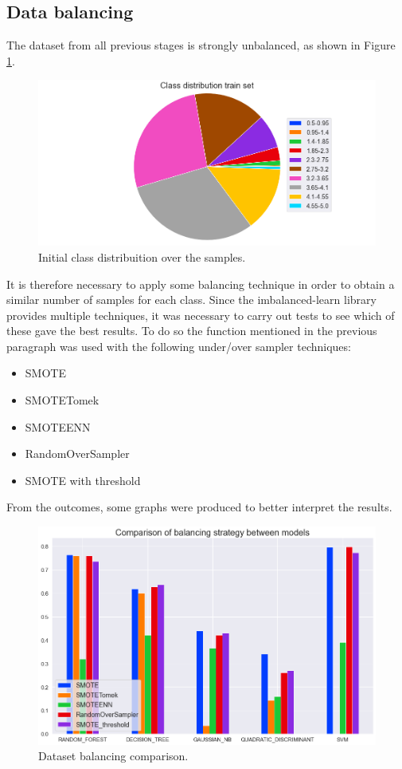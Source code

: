 \documentclass[../main]{subfiles}
\begin{document}
\subsection*{Data balancing}
The dataset from all previous stages is strongly unbalanced, as shown in Figure \ref{fig:unbalanced}.
\begin{figure}[h]
    \center
    \includegraphics[width=0.6\linewidth]{figures/class_distribution_initial.png}    
    \caption{Initial class distribuition over the samples.}
    \label{fig:unbalanced}
\end{figure}

It is therefore necessary to apply some balancing technique in order to obtain a similar number of samples for each class.
Since the imbalanced-learn \cite{JMLR:v18:16-365} library provides multiple techniques, it was necessary to carry out tests to see which of these gave the best results.
To do so the function mentioned in the previous paragraph was used with the following under/over sampler techniques:
\begin{itemize}
    \item SMOTE
    \item SMOTETomek
    \item SMOTEENN
    \item RandomOverSampler
    \item SMOTE with threshold
\end{itemize}

From the outcomes, some graphs were produced to better interpret the results.
\begin{figure}[h]
    \center
    \includegraphics[width=0.6\linewidth]{figures/imbalance_evaluation.png}
    \caption{Dataset balancing comparison.}
    \label{fig:balance_evaluation}
\end{figure}
\end{document}
